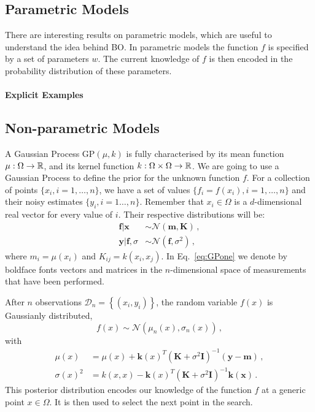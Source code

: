 \subsection{Parametric Models}
\label{sec:BaysParMod}

There are interesting results on parametric models, which are useful to
understand the idea behind BO. In parametric models the function $f$ is
specified by a set of parameters $w$. The current knowledge of $f$ is then
encoded in the probability distribution of these parameters.

\paragraph[]{Explicit Examples}

\subsection{Non-parametric Models}
\label{sec:BaysNonParMod}

A Gaussian Process $\mathrm{GP}(\mu, k)$ is fully characterised by its mean
function $\mu: \Omega\to \mathbb{R}$, and its kernel function $k: \Omega \times \Omega
\to \mathbb{R}$. We are going to use a Gaussian Process to define the prior for the
unknown function $f$. For a collection of points $\{x_i, i=1,\ldots,n\}$, we
have a set of values $\{f_i=f(x_i), i=1,\ldots,n\}$ and their noisy estimates
$\{y_i, i=1\ldots, n\}$. Remember that $x_i\in\Omega$ is a $d$-dimensional real
vector for every value of $i$. Their respective distributions will be:
\begin{align}
    \label{eq:GPone}
    \mathbf{f}|\mathbf{x} &\sim
        \mathcal{N}\left(\mathbf{m},\mathbf{K}\right)\, ,\\
    \mathbf{y}|\mathbf{f},\sigma &\sim
        \mathcal{N}\left(\mathbf{f},\sigma^2\right)\, ,
\end{align}
where $m_i=\mu(x_i)$ and $K_{ij}=k(x_i,x_j)$. In Eq.~\eqref{eq:GPone} we denote
by boldface fonts vectors and matrices in the $n$-dimensional space of
measurements that have been performed.

After $n$ observations $\mathcal{D}_n=\left\{\left(x_i,y_i\right)\right\}$, the random variable $f(x)$ is Gaussianly distributed,
\begin{equation}
    \label{eq:PostGaussF}
    f(x)\sim \mathcal{N}\left(\mu_n(x),\sigma_n(x)\right)\, ,
\end{equation}
with
\begin{align}
    \label{eq:PostParams}
    \mu(x) &= \mu(x) + \mathbf{k}(x)^T \left(\mathbf{K} + \sigma^2 \mathbf{I}\right)^{-1} \left(\mathbf{y}-\mathbf{m}\right)\, , \\
    \sigma(x)^2 &= k(x,x) - \mathbf{k}(x)^T \left(\mathbf{K} + \sigma^2 \mathbf{I}\right)^{-1} \mathbf{k}(\mathbf{x})\, .
\end{align}
This posterior distribution encodes our knowledge of the function $f$ at a
generic point $x\in\Omega$. It is then used to select the next point in the
search.

